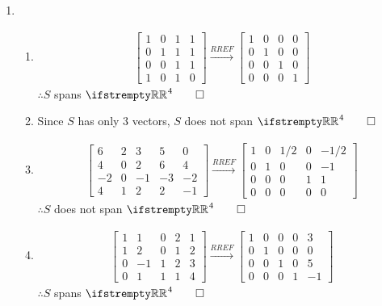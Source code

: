 \documentclass[12pt, a4paper]{article}
\begin{document}
\begin{enumerate}[Q\arabic*.]
  \item
    \begin{enumerate}[(\alph*)]
      \item 
        \begin{align*}
          \begin{bmatrix}
            1 & 0 & 1 & 1\\
            0&1&1&1\\
            0&0&1&1\\
            1&0&1&0
          \end{bmatrix}\xrightarrow{RREF}
          \begin{bmatrix}
            1 & 0 & 0 & 0\\
            0 & 1 & 0 & 0\\
            0 & 0 & 1 & 0\\
            0 & 0 & 0 & 1
          \end{bmatrix}
        \end{align*}
        $\therefore S$ spans $\RR^4 \qed$
      \item Since $S$ has only 3 vectors, $S$ does not span $\RR^4 \qed$

      \item 
        \begin{align*}
          \begin{bmatrix}
            6&2&3&5&0\\
            4&0&2&6&4\\
            -2&0&-1&-3&-2\\
            4&1&2&2&-1
          \end{bmatrix}\xrightarrow{RREF}
          \begin{bmatrix}
            1&0&1/2&0&-1/2\\
            0&1&0&0&-1\\
            0&0&0&1&1\\
            0&0&0&0&0
          \end{bmatrix}
        \end{align*}
        $\therefore S$ does not span $\RR^4 \qed$
      
      \item 
        \begin{align*}
          \begin{bmatrix}
            1&1&0&2&1\\
            1&2&0&1&2\\
            0&-1&1&2&3\\
            0&1&1&1&4
          \end{bmatrix}\xrightarrow{RREF}
          \begin{bmatrix}
            1&0&0&0&3\\
            0&1&0&0&0\\
            0&0&1&0&5\\
            0&0&0&1&-1
          \end{bmatrix}
        \end{align*}
        $\therefore S$ spans $\RR^4 \qed$
    \end{enumerate}


\end{enumerate}
\end{document}
